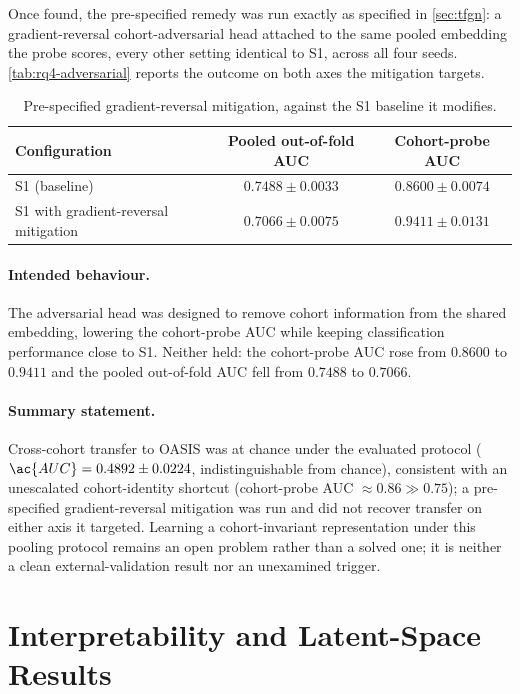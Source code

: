 Once found, the pre-specified remedy was run exactly as specified in \autoref{sec:tfgn}: a gradient-reversal
cohort-adversarial head attached to the same pooled embedding the probe scores, every other
setting identical to S1, across all four seeds. \autoref{tab:rq4-adversarial} reports the
outcome on both axes the mitigation targets.

\begin{table}[htbp]
\centering
\caption{Pre-specified gradient-reversal mitigation, against the S1 baseline it modifies.}
\label{tab:rq4-adversarial}
\begin{tabular}{@{}lcc@{}}
\toprule
Configuration & Pooled out-of-fold \ac{AUC} & Cohort-probe \ac{AUC} \\
\midrule
S1 (baseline) & $0.7488 \pm 0.0033$ & $0.8600 \pm 0.0074$ \\
S1 with gradient-reversal mitigation & $0.7066 \pm 0.0075$ & $0.9411 \pm 0.0131$ \\
\bottomrule
\end{tabular}
\end{table}

\paragraph{Intended behaviour.} The adversarial head was designed to remove cohort information from the shared embedding,
lowering the cohort-probe \ac{AUC} while keeping classification performance close to S1.
Neither held: the cohort-probe \ac{AUC} rose from $0.8600$ to $0.9411$ and the pooled out-of-fold \ac{AUC} fell from $0.7488$ to $0.7066$.

\paragraph{Summary statement.} Cross-cohort transfer to \ac{OASIS} was at chance under the
evaluated protocol ($\ac{AUC} = 0.4892 \pm 0.0224$, indistinguishable from chance),
consistent with an unescalated cohort-identity shortcut (cohort-probe \ac{AUC}
$\approx 0.86 \gg 0.75$); a pre-specified gradient-reversal mitigation was run and did not
recover transfer on either axis it targeted. Learning a cohort-invariant representation
under this pooling protocol remains an open problem rather than a solved one; it is neither
a clean external-validation result nor an unexamined trigger.

\section{Interpretability and Latent-Space Results}\label{sec:interpretability-results}

